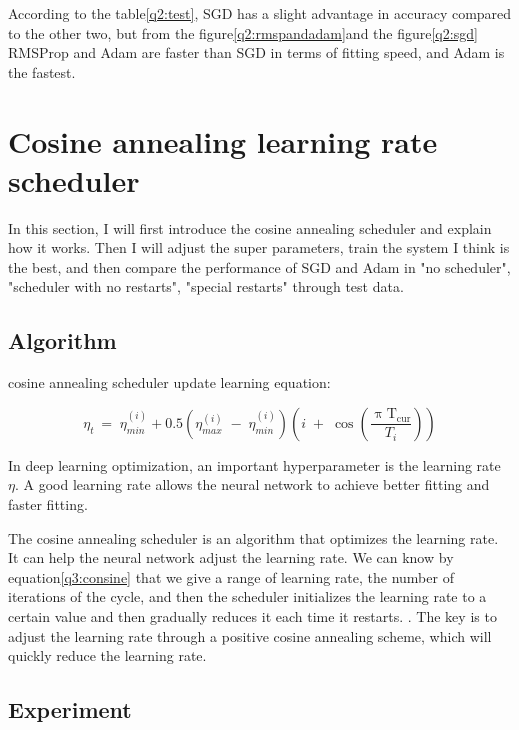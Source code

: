 \documentclass{article}
\begin{document}
According to the table\ref{q2:test}, SGD has a slight advantage in accuracy compared to the other two, but from the figure\ref{q2:rmspandadam}and the figure\ref{q2:sgd} RMSProp and Adam are faster than SGD in terms of fitting speed, and Adam is the fastest.


\section{Cosine annealing learning rate scheduler}

In this section, I will first introduce the cosine annealing scheduler and explain how it works. Then I will adjust the super parameters, train the system I think is the best, and then compare the performance of SGD and Adam in "no scheduler", "scheduler with no restarts", "special restarts" through test data.

\subsection{Algorithm}

cosine annealing scheduler update learning equation:

\begin{equation}\label{q3:cosine}
\eta_{t\;}=\;\eta_{min}^{(i)}+0.5(\eta_{max}^{(i)}\;-\;\eta_{min}^{(i)})(i\;+\;\cos(\frac{{\mathrm{\uppi T}}_\mathrm{cur}}{T_i}))
\end{equation}

In deep learning optimization, an important hyperparameter is the learning rate $\eta$. A good learning rate allows the neural network to achieve better fitting and faster fitting.

The cosine annealing scheduler is an algorithm that optimizes the learning rate. It can help the neural network adjust the learning rate. We can know by equation\ref{q3:consine} that we give a range of learning rate, the number of iterations of the cycle, and then the scheduler initializes the learning rate to a certain value and then gradually reduces it each time it restarts. . The key is to adjust the learning rate through a positive cosine annealing scheme, which will quickly reduce the learning rate.

\subsection{Experiment}
\end{document}
